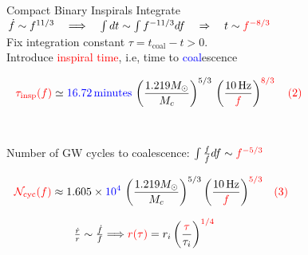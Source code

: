 \documentclass[xcolor=dvipsnames,handout,t]{beamer}
\newcommand{\red}[1]{\textcolor{red}{#1}}
\newcommand{\bl}[1]{\textcolor{blue}{#1}}
\newcommand{\f}{\frac}
\newcommand{\nn}{\nonumber}
\begin{document}
\begin{frame}{Compact Binary Inspirals}
  \vspace{-3mm}
  Integrate $\dot{f} \sim f^{11/3} \quad \Longrightarrow \quad \int dt \sim \int f^{-11/3}df \quad\Rightarrow\quad t \sim \red{f^{-8/3}}$
  \\
  \vspace{1mm}
  Fix integration constant $\tau = t_\text{coal} - t >0$. \\
  \vspace{2mm}
  Introduce \red{inspiral time}, i.e, time to \bl{coal}escence
  \begin{small}
  \begin{align}
  \red{\tau_\text{insp}(f)} %
  &\simeq \bl{16.72\,\text{minutes}} \, \left(\f{1.219 M_\odot}{M_c}\right)^{5/3}\,{\left(\f{10\,\text{Hz}}{\red{f}}\right)^{\red{8/3}}\quad \red{(2)}}\nn\hspace{2.7cm}
  \end{align}
  \end{small}
  \\
  {
    Number of GW cycles to coalescence: $\int \tfrac{f}{\dot{f}}df\sim \red{f^{-5/3}}$ %
    \begin{small}
    \begin{align}
    \red{\mathcal{N}_\text{cyc}(f)} %
    &\approx 1.605\times \bl{10^4}\,\left(\f{1.219 M_\odot}{M_c}\right)^{5/3}{ \left(\f{10\,\text{Hz}}{\red{f}} \right)^{\red{5/3}}}\quad \red{(3)}\nn\hspace{3.2cm}
    \end{align}
    \end{small}
  }
  {
    \[ 
    \tfrac{\dot{r}}{r}\sim \tfrac{\dot{f}}{f} \Longrightarrow \red{r(\tau)}=r_i \left(\f{\red{\tau}}{\tau_i}\right)^{\red{1/4}} \hspace{4cm}
    \]
  }
\end{frame}
\end{document}
